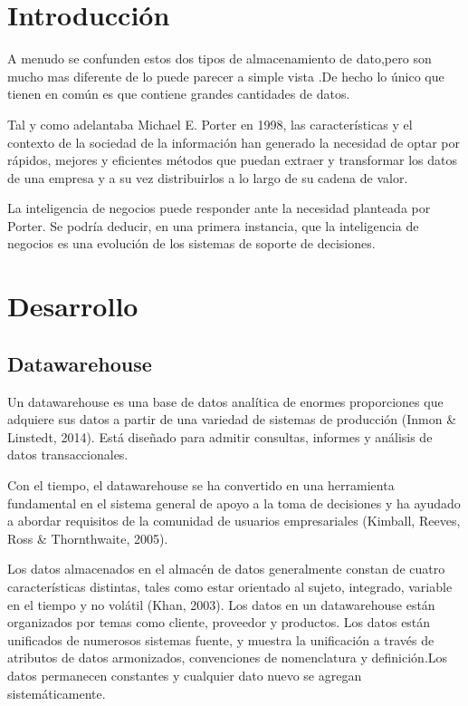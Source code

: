 \documentclass{article}
\begin{document}
\begin{multicols}{2}

\section{Introducción} 
A menudo se confunden estos dos tipos de almacenamiento de dato,pero son mucho mas diferente de lo puede parecer a simple vista .De hecho lo único que tienen en común es que contiene grandes cantidades de datos.

Tal y como adelantaba Michael E. Porter en 1998, las características y el contexto de la sociedad de la información han generado la necesidad de optar por rápidos, mejores y eficientes métodos que puedan extraer y transformar los datos de una empresa y a su vez distribuirlos a lo largo de su cadena de valor. 

La inteligencia de negocios puede responder ante la necesidad planteada por Porter. Se podría deducir, en una primera instancia, que la inteligencia de negocios es una evolución de los sistemas de soporte de decisiones.

\section{Desarrollo}

\subsection{Datawarehouse}

Un datawarehouse es una base de datos analítica de enormes proporciones que adquiere sus datos a partir de una variedad de sistemas de producción (Inmon \& Linstedt, 2014). Está diseñado para admitir consultas, informes y análisis de datos transaccionales. 

Con el tiempo, el datawarehouse se ha convertido en una herramienta fundamental en el sistema general de apoyo a la toma de decisiones y ha ayudado a abordar requisitos de la comunidad de usuarios empresariales (Kimball, Reeves, Ross \& Thornthwaite, 2005).

Los datos almacenados en el almacén de datos generalmente constan de cuatro características distintas, tales como estar orientado al sujeto, integrado, variable en el tiempo y no volátil (Khan, 2003). Los datos en un datawarehouse están organizados por temas como cliente, proveedor y productos. Los datos están unificados
de numerosos sistemas fuente, y muestra la unificación a través de atributos de datos armonizados, convenciones de nomenclatura y definición.Los datos permanecen constantes y cualquier dato nuevo se agregan sistemáticamente.


\end{multicols}
\end{document}
